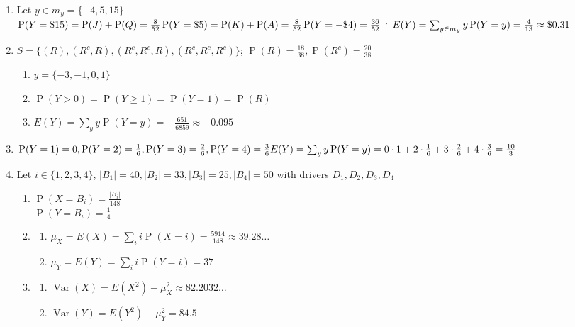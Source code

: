 \documentclass{article}
\newcommand{\set}[1]{\{#1\}}
\newcommand{\pr}[1]{\operatorname{P}(#1)}
\newcommand{\var}[1]{\operatorname{Var}(#1)}
\begin{document}
\begin{enumerate}
  \item Let $y\in m_y = \set{-4,5,15}$
  \begin{math}
    \pr{Y=\$15} = \pr{J} + \pr{Q} = \frac{8}{52}\\
    \pr{Y=\$5} = \pr{K} + \pr{A} = \frac{8}{52}\\
    \pr{Y=-\$4} = \frac{36}{52}\\
    \therefore E(Y) = \sum_{y\in m_y}y\pr{Y=y} = \frac{4}{13} \approx \$0.31
  \end{math}
  
  \item $S = \set{(R), (R^c, R), (R^c, R^c, R), (R^c, R^c, R^c)}$; $ \pr{R} = \frac{18}{38}, \pr{R^c} = \frac{20}{38}$
  \begin{enumerate}
    \item $y = \set{-3, -1, 0, 1}$
    \item $\pr{Y > 0} = \pr{Y \geq 1} = \pr{Y = 1} = \pr{R}$
    \item $E(Y) = \sum_{y}y\pr{Y=y} = -\frac{651}{6859} \approx -0.095$
  \end{enumerate}

  \item \begin{math}
    \pr{Y = 1} = 0, \pr{Y = 2} = \frac{1}{6}, \pr{Y = 3} = \frac{2}{6}, \pr{Y = 4} = \frac{3}{6}\\
    E(Y) = \sum_{y}y\pr{Y=y} = 0\cdot 1 + 2\cdot\frac{1}{6} + 3\cdot\frac{2}{6} + 4\cdot\frac{3}{6} = \frac{10}{3}
  \end{math}
  
  \item Let $i \in \set{1,2,3,4}$, $|B_1| = 40, |B_2| = 33, |B_3| = 25, |B_4| = 50$ with drivers $D_1, D_2, D_3, D_4$
  \begin{enumerate}
    \item $\pr{X=B_i} = \frac{|B_i|}{148}$\\
    $\pr{Y=B_i} = \frac{1}{4}$
    \item \begin{enumerate}
      \item $\mu_X = E(X) = \sum_{i}i\pr{X=i} = \frac{5914}{148} \approx 39.28\ldots$
      \item $\mu_Y = E(Y) = \sum_{i}i\pr{Y=i} = 37$
    \end{enumerate}
    \item \begin{enumerate}
      \item $\var{X} = E(X^2) - \mu_X^2 \approx 82.2032\ldots$
      \item $\var{Y} = E(Y^2) - \mu_Y^2 = 84.5$
    \end{enumerate}
  \end{enumerate}
  

\end{enumerate}
\end{document}
